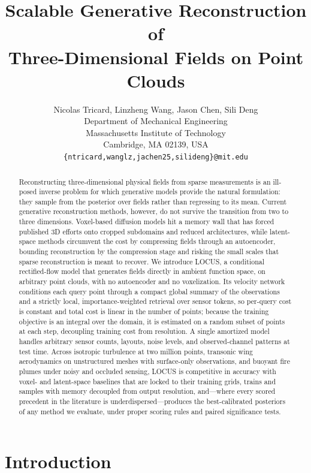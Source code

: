 \documentclass{article} %
\title{Scalable Generative Reconstruction of\\Three-Dimensional Fields on Point Clouds}
\author{Nicolas Tricard, Linzheng Wang, Jason Chen, Sili Deng \\
Department of Mechanical Engineering\\
Massachusetts Institute of Technology\\
Cambridge, MA 02139, USA \\
\texttt{\{ntricard,wanglz,jachen25,silideng\}@mit.edu} \\
}
\newcommand{\model}{LOCUS}
\begin{document}
\maketitle

\begin{abstract}
Reconstructing three-dimensional physical fields from sparse measurements is an ill-posed inverse problem for which generative models provide the natural formulation: they sample from the posterior over fields rather than regressing to its mean. Current generative reconstruction methods, however, do not survive the transition from two to three dimensions. Voxel-based diffusion models hit a memory wall that has forced published 3D efforts onto cropped subdomains and reduced architectures, while latent-space methods circumvent the cost by compressing fields through an autoencoder, bounding reconstruction by the compression stage and risking the small scales that sparse reconstruction is meant to recover. We introduce \model{}, a conditional rectified-flow model that generates fields directly in ambient function space, on arbitrary point clouds, with no autoencoder and no voxelization. Its velocity network conditions each query point through a compact global summary of the observations and a strictly local, importance-weighted retrieval over sensor tokens, so per-query cost is constant and total cost is linear in the number of points; because the training objective is an integral over the domain, it is estimated on a random subset of points at each step, decoupling training cost from resolution. A single amortized model handles arbitrary sensor counts, layouts, noise levels, and observed-channel patterns at test time. Across isotropic turbulence at two million points, transonic wing aerodynamics on unstructured meshes with surface-only observations, and buoyant fire plumes under noisy and occluded sensing, \model{} is competitive in accuracy with voxel- and latent-space baselines that are locked to their training grids, trains and samples with memory decoupled from output resolution, and---where every scored precedent in the literature is underdispersed---produces the best-calibrated posteriors of any method we evaluate, under proper scoring rules and paired significance tests.
\end{abstract}

\section{Introduction}
\label{sec:intro}
\end{document}
